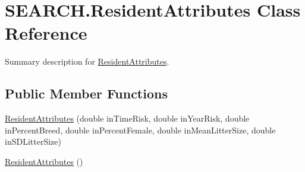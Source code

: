 \hypertarget{class_s_e_a_r_c_h_1_1_resident_attributes}{\section{S\-E\-A\-R\-C\-H.\-Resident\-Attributes Class Reference}
\label{class_s_e_a_r_c_h_1_1_resident_attributes}
}


Summary description for \hyperlink{class_s_e_a_r_c_h_1_1_resident_attributes}{Resident\-Attributes}.  


\subsection*{Public Member Functions}
\begin{DoxyCompactItemize}
\item 
\hyperlink{class_s_e_a_r_c_h_1_1_resident_attributes_a1c3407543698d67a7a73dec25525447d}{Resident\-Attributes} (double in\-Time\-Risk, double in\-Year\-Risk, double in\-Percent\-Breed, double in\-Percent\-Female, double in\-Mean\-Litter\-Size, double in\-S\-D\-Litter\-Size)
\item 
\hyperlink{class_s_e_a_r_c_h_1_1_resident_attributes_a93eadf31677dde80b5d244f7697c40a3}{Resident\-Attributes} ()
\end{DoxyCompactItemize}

